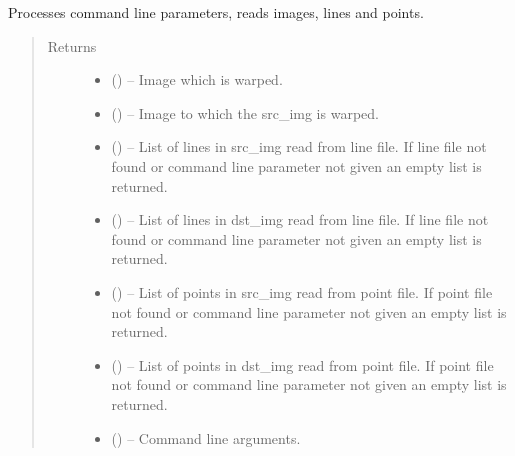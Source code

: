 \documentclass[letterpaper,10pt,english]{sphinxmanual}
\begin{document}
\begin{fulllineitems}
\label{\detokenize{aaap_re_photo:aaap_re_photo.init}}
Processes command line parameters, reads images, lines and points.
\begin{quote}\begin{description}
\item[{Returns}] \leavevmode
\begin{itemize}
\item {} 
 () -- Image which is warped.

\item {} 
 () -- Image to which the src\_img is warped.

\item {} 
 () -- List of lines in src\_img read from line file. If line file not found or
command line parameter  not given an empty list is returned.

\item {} 
 () -- List of lines in dst\_img read from line file. If line file not found or
command line parameter  not given an empty list is returned.

\item {} 
 () -- List of points in src\_img read from point file. If point file not found or
command line parameter  not given an empty list is returned.

\item {} 
 () -- List of points in dst\_img read from point file. If point file not found or
command line parameter  not given an empty list is returned.

\item {} 
 () -- Command line arguments.

\end{itemize}


\end{description}\end{quote}

\end{fulllineitems}
\end{document}
